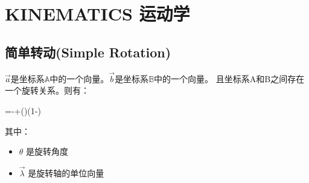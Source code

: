 \chapter{KINEMATICS 运动学}
\section{简单转动(Simple Rotation)}
$\vec{a}$是坐标系$\mathbb{A}$中的一个向量。$\vec{b}$是坐标系$\mathbb{B}$中的一个向量。
且坐标系A和B之间存在一个旋转关系。则有：
\begin{myformula}[title={Rodrigues 旋转公式}]
    =\cos\theta-\times\vec{\lambda}\sin\theta+\vec{\lambda}(\vec{\lambda}\cdot{})(1-\cos\theta)
\end{myformula}
其中：
\begin{itemize}
    \item $\theta$ 是旋转角度
    \item $\vec{\lambda}$ 是旋转轴的单位向量
\end{itemize}

